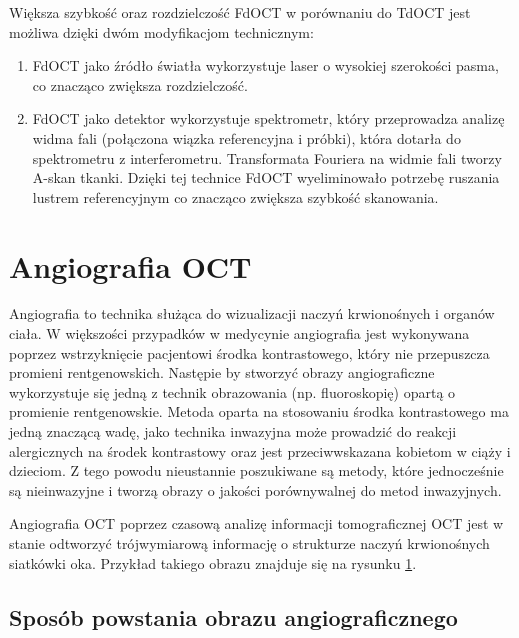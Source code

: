Większa szybkość oraz rozdzielczość FdOCT w porównaniu do TdOCT jest możliwa dzięki dwóm modyfikacjom technicznym:

\begin{enumerate}

\item FdOCT jako źródło światła wykorzystuje laser o wysokiej szerokości pasma, co znacząco zwiększa rozdzielczość.
\item FdOCT jako detektor wykorzystuje spektrometr, który przeprowadza analizę widma fali (połączona wiązka referencyjna i próbki), która dotarła do spektrometru z interferometru. Transformata Fouriera na widmie fali tworzy A-skan tkanki. Dzięki tej technice FdOCT wyeliminowało potrzebę ruszania lustrem referencyjnym co znacząco zwiększa szybkość skanowania.

\end{enumerate}


\section{Angiografia OCT}
\label{sec:obrazowanie_oct:angiografia_oct}

Angiografia to technika służąca do wizualizacji naczyń krwionośnych i organów ciała. W większości przypadków w medycynie angiografia jest wykonywana poprzez wstrzyknięcie pacjentowi środka kontrastowego, który nie przepuszcza promieni rentgenowskich. Następie by stworzyć obrazy angiograficzne wykorzystuje się jedną z technik obrazowania (np. fluoroskopię) opartą o promienie rentgenowskie. Metoda oparta na stosowaniu środka kontrastowego ma jedną znaczącą wadę, jako technika inwazyjna może prowadzić do reakcji alergicznych na środek kontrastowy oraz jest przeciwwskazana kobietom w ciąży i dzieciom. Z tego powodu nieustannie poszukiwane są metody, które jednocześnie są nieinwazyjne i tworzą obrazy o jakości porównywalnej do metod inwazyjnych.

Angiografia OCT poprzez czasową analizę informacji tomograficznej OCT jest w stanie odtworzyć trójwymiarową informację o strukturze naczyń krwionośnych siatkówki oka. Przykład takiego obrazu znajduje się na rysunku \ref{sec:obrazowanie_oct:angiografia_oct}.

\subsection{Sposób powstania obrazu angiograficznego}

